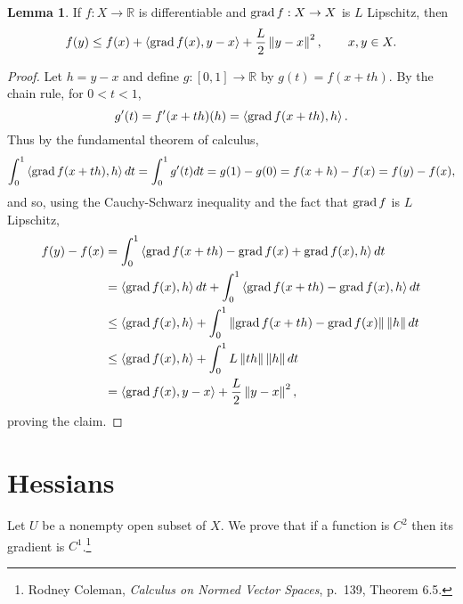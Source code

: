 \documentclass{article}
\newcommand{\inner}[2]{\left\langle #1, #2 \right\rangle}
\newcommand{\grad}{\ensuremath\mathrm{grad}\,}
\newcommand{\norm}[1]{\left\Vert #1 \right\Vert}
\theoremstyle{definition}
\newtheorem{lemma}[theorem]{Lemma}
\theoremstyle{definition}
\begin{document}
\begin{lemma}
If $f:X \to \mathbb{R}$ is differentiable and $\grad f:X \to X$ is $L$ Lipschitz, then
\[
f(y) \leq f(x)+\inner{\grad f(x)}{y-x}+\frac{L}{2} \norm{y-x}^2,\qquad x,y \in X.
\]
\label{lipschitz}
\end{lemma}
\begin{proof}
Let $h=y-x$ and define $g:[0,1] \to \mathbb{R}$ by $g(t) = f(x+th)$. By the 
chain rule, for $0<t<1$,
\[
g'(t) = f'(x+th)(h) = \inner{\grad f(x+th)}{h}.
\]
Thus by the fundamental theorem of calculus,
\[
\int_0^1 \inner{\grad f(x+th)}{h} dt = \int_0^1 g'(t) dt = g(1)-g(0) = f(x+h)-f(x)=f(y)-f(x),
\]
and so, using the Cauchy-Schwarz inequality and the fact that $\grad f$ is $L$ Lipschitz,
\begin{align*}
f(y)-f(x)&= \int_0^1 \inner{\grad f(x+th)-\grad f(x)+\grad f(x)}{h} dt \\
&= \inner{\grad f(x)}{h} dt + \int_0^1 \inner{\grad f(x+th)-\grad f(x)}{h} dt\\
&\leq  \inner{\grad f(x)}{h}   +\int_0^1 \norm{\grad f(x+th)-\grad f(x)} \norm{h} dt\\
&\leq  \inner{\grad f(x)}{h} + \int_0^1 L \norm{th} \norm{h} dt\\
&=  \inner{\grad f(x)}{y-x} + \frac{L}{2} \norm{y-x}^2,
\end{align*}
proving the claim.
\end{proof}





\section{Hessians}
Let $U$ be a nonempty open subset of $X$. We prove that if a function is $C^2$ then its gradient is $C^1$.\footnote{Rodney Coleman, {\em Calculus on Normed Vector Spaces},
p.~139, Theorem 6.5.}
\end{document}
